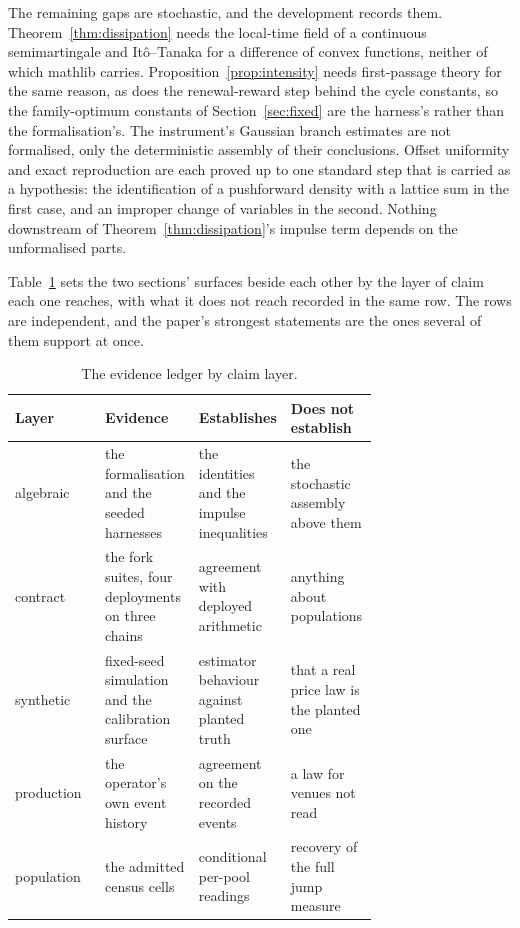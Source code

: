 \documentclass[11pt,a4paper]{article}
\theoremstyle{definition}
\theoremstyle{plain}
\theoremstyle{remark}
\begin{document}
The remaining gaps are stochastic, and the development records them. Theorem~\ref{thm:dissipation} needs the local-time field of a continuous semimartingale and It\^o--Tanaka 
for a difference of convex functions, neither of which mathlib carries. Proposition~\ref{prop:intensity} needs first-passage theory for the same reason, as does the renewal-reward 
step behind the cycle constants, so the family-optimum constants of Section~\ref{sec:fixed} are the harness's rather than the formalisation's. The instrument's Gaussian branch 
estimates are not formalised, only the deterministic assembly of their conclusions. Offset uniformity and exact reproduction are each proved up to one standard step that is 
carried as a hypothesis: the identification of a pushforward density with a lattice sum in the first case, and an improper change of variables in the second. Nothing downstream 
of Theorem~\ref{thm:dissipation}'s impulse term depends on the unformalised parts.

Table~\ref{tab:evidence} sets the two sections' surfaces beside each other by the layer of claim each one reaches, with what it does not reach recorded in the same row. The 
rows are independent, and the paper's strongest statements are the ones several of them support at once.

\begin{table}[H]
\centering
\caption{The evidence ledger by claim layer.}
\label{tab:evidence}
\begin{tabular}{@{}lp{0.24\linewidth}p{0.24\linewidth}p{0.24\linewidth}@{}}
\toprule
Layer & Evidence & Establishes & Does not establish \\
\midrule
algebraic & the formalisation and the seeded harnesses & the identities and the impulse inequalities & the stochastic assembly above them \\
contract & the fork suites, four deployments on three chains & agreement with deployed arithmetic & anything about populations \\
synthetic & fixed-seed simulation and the calibration surface & estimator behaviour against planted truth & that a real price law is the planted one \\
production & the operator's own event history & agreement on the recorded events & a law for venues not read \\
population & the admitted census cells & conditional per-pool readings & recovery of the full jump measure \\
\bottomrule
\end{tabular}
\end{table}
\end{document}
